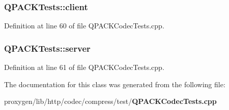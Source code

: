 \subsubsection[{client}]{ Q\+P\+A\+C\+K\+Tests\+::client\hspace{0.3cm}{\ttfamily [protected]}}\label{classQPACKTests_a7ff04fc429426367e826d4286638aa09}


Definition at line 60 of file Q\+P\+A\+C\+K\+Codec\+Tests.\+cpp.

\subsubsection[{server}]{ Q\+P\+A\+C\+K\+Tests\+::server\hspace{0.3cm}{\ttfamily [protected]}}\label{classQPACKTests_a6812bb926c33a19de765584bce9e2d6a}


Definition at line 61 of file Q\+P\+A\+C\+K\+Codec\+Tests.\+cpp.



The documentation for this class was generated from the following file\+:\begin{DoxyCompactItemize}
\item 
proxygen/lib/http/codec/compress/test/{\bf Q\+P\+A\+C\+K\+Codec\+Tests.\+cpp}\end{DoxyCompactItemize}
